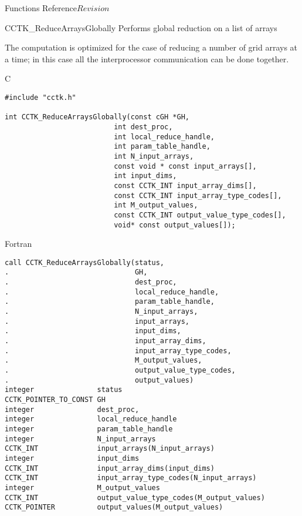 \begin{cactuspart}{ Functions Reference}{}{$Revision$}

\begin{FunctionDescription}{CCTK\_ReduceArraysGlobally}
\label{CCTK-ReduceArraysGlobally}
Performs global reduction on a list of arrays

The computation is optimized for the case of reducing a
number of grid arrays at a time; in this case all the interprocessor
communication can be done together.

\begin{SynopsisSection}
\begin{Synopsis}{C}
\begin{verbatim}
#include "cctk.h"

int CCTK_ReduceArraysGlobally(const cGH *GH,
                          int dest_proc,
                          int local_reduce_handle,
                          int param_table_handle,
                          int N_input_arrays,
                          const void * const input_arrays[],
                          int input_dims,
                          const CCTK_INT input_array_dims[],
                          const CCTK_INT input_array_type_codes[],
                          int M_output_values,
                          const CCTK_INT output_value_type_codes[],
                          void* const output_values[]);
\end{verbatim}
\end{Synopsis}
\begin{Synopsis}{Fortran}
\begin{verbatim}
call CCTK_ReduceArraysGlobally(status,
.                              GH,
.                              dest_proc,
.                              local_reduce_handle,
.                              param_table_handle,
.                              N_input_arrays,
.                              input_arrays,
.                              input_dims,
.                              input_array_dims,
.                              input_array_type_codes,
.                              M_output_values,
.                              output_value_type_codes,
.                              output_values)
integer               status
CCTK_POINTER_TO_CONST GH
integer               dest_proc,
integer               local_reduce_handle
integer               param_table_handle
integer               N_input_arrays
CCTK_INT              input_arrays(N_input_arrays)
integer               input_dims
CCTK_INT              input_array_dims(input_dims)
CCTK_INT              input_array_type_codes(N_input_arrays)
integer               M_output_values
CCTK_INT              output_value_type_codes(M_output_values)
CCTK_POINTER          output_values(M_output_values)
\end{verbatim}
\end{Synopsis}
\end{SynopsisSection}


\end{FunctionDescription}
\end{cactuspart}
